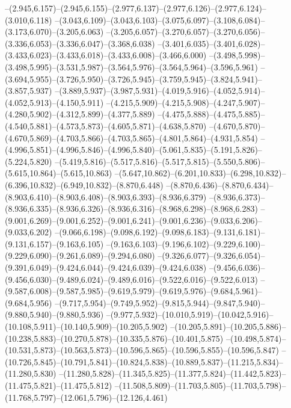   --(2.945,6.157)--(2.945,6.155)--(2.977,6.137)--(2.977,6.126)--(2.977,6.124)--(3.010,6.118)%
  --(3.043,6.109)--(3.043,6.103)--(3.075,6.097)--(3.108,6.084)--(3.173,6.070)--(3.205,6.063)%
  --(3.205,6.057)--(3.270,6.057)--(3.270,6.056)--(3.336,6.053)--(3.336,6.047)--(3.368,6.038)%
  --(3.401,6.035)--(3.401,6.028)--(3.433,6.023)--(3.433,6.018)--(3.433,6.008)--(3.466,6.000)%
  --(3.498,5.998)--(3.498,5.995)--(3.531,5.987)--(3.564,5.976)--(3.564,5.964)--(3.596,5.961)%
  --(3.694,5.955)--(3.726,5.950)--(3.726,5.945)--(3.759,5.945)--(3.824,5.941)--(3.857,5.937)%
  --(3.889,5.937)--(3.987,5.931)--(4.019,5.916)--(4.052,5.914)--(4.052,5.913)--(4.150,5.911)%
  --(4.215,5.909)--(4.215,5.908)--(4.247,5.907)--(4.280,5.902)--(4.312,5.899)--(4.377,5.889)%
  --(4.475,5.888)--(4.475,5.885)--(4.540,5.881)--(4.573,5.873)--(4.605,5.871)--(4.638,5.870)%
  --(4.670,5.870)--(4.670,5.869)--(4.703,5.866)--(4.703,5.865)--(4.801,5.864)--(4.931,5.854)%
  --(4.996,5.851)--(4.996,5.846)--(4.996,5.840)--(5.061,5.835)--(5.191,5.826)--(5.224,5.820)%
  --(5.419,5.816)--(5.517,5.816)--(5.517,5.815)--(5.550,5.806)--(5.615,10.864)--(5.615,10.863)%
  --(5.647,10.862)--(6.201,10.833)--(6.298,10.832)--(6.396,10.832)--(6.949,10.832)--(8.870,6.448)%
  --(8.870,6.436)--(8.870,6.434)--(8.903,6.410)--(8.903,6.408)--(8.903,6.393)--(8.936,6.379)%
  --(8.936,6.373)--(8.936,6.335)--(8.936,6.326)--(8.936,6.316)--(8.968,6.298)--(8.968,6.283)%
  --(9.001,6.269)--(9.001,6.252)--(9.001,6.241)--(9.001,6.236)--(9.033,6.206)--(9.033,6.202)%
  --(9.066,6.198)--(9.098,6.192)--(9.098,6.183)--(9.131,6.181)--(9.131,6.157)--(9.163,6.105)%
  --(9.163,6.103)--(9.196,6.102)--(9.229,6.100)--(9.229,6.090)--(9.261,6.089)--(9.294,6.080)%
  --(9.326,6.077)--(9.326,6.054)--(9.391,6.049)--(9.424,6.044)--(9.424,6.039)--(9.424,6.038)%
  --(9.456,6.036)--(9.456,6.030)--(9.489,6.024)--(9.489,6.016)--(9.522,6.016)--(9.522,6.013)%
  --(9.587,6.008)--(9.587,5.985)--(9.619,5.979)--(9.619,5.976)--(9.684,5.961)--(9.684,5.956)%
  --(9.717,5.954)--(9.749,5.952)--(9.815,5.944)--(9.847,5.940)--(9.880,5.940)--(9.880,5.936)%
  --(9.977,5.932)--(10.010,5.919)--(10.042,5.916)--(10.108,5.911)--(10.140,5.909)--(10.205,5.902)%
  --(10.205,5.891)--(10.205,5.886)--(10.238,5.883)--(10.270,5.878)--(10.335,5.876)--(10.401,5.875)%
  --(10.498,5.874)--(10.531,5.873)--(10.563,5.873)--(10.596,5.865)--(10.596,5.855)--(10.596,5.847)%
  --(10.726,5.845)--(10.791,5.841)--(10.824,5.838)--(10.889,5.837)--(11.215,5.834)--(11.280,5.830)%
  --(11.280,5.828)--(11.345,5.825)--(11.377,5.824)--(11.442,5.823)--(11.475,5.821)--(11.475,5.812)%
  --(11.508,5.809)--(11.703,5.805)--(11.703,5.798)--(11.768,5.797)--(12.061,5.796)--(12.126,4.461)%
